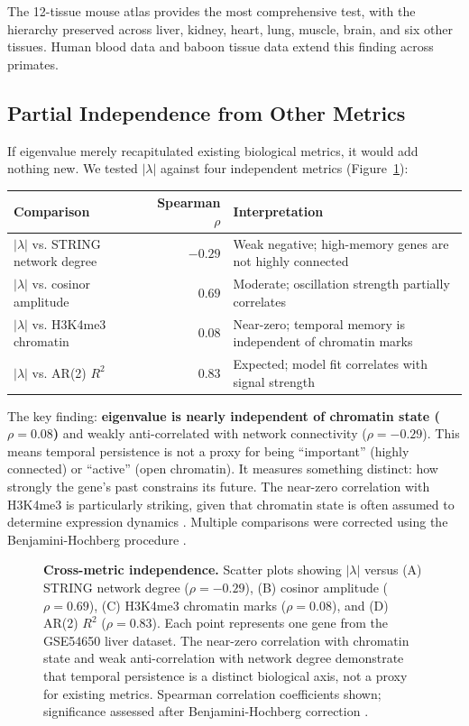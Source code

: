 \documentclass[11pt,letterpaper]{article}
\begin{document}
The 12-tissue mouse atlas \citep{zhang2014circadian} provides the most comprehensive test, with the hierarchy preserved across liver, kidney, heart, lung, muscle, brain, and six other tissues. Human blood data \citep{hughes2010jtk} and baboon tissue data \citep{mure2018diurnal} extend this finding across primates.

\subsection{Partial Independence from Other Metrics}

If eigenvalue merely recapitulated existing biological metrics, it would add nothing new. We tested $|\lambda|$ against four independent metrics (Figure~\ref{fig:independence}):

\begin{center}
\begin{tabular}{lrp{5cm}}
\toprule
\textbf{Comparison} & \textbf{Spearman $\rho$} & \textbf{Interpretation} \\
\midrule
$|\lambda|$ vs. STRING network degree & $-0.29$ & Weak negative; high-memory genes are not highly connected \\
$|\lambda|$ vs. cosinor amplitude & $0.69$ & Moderate; oscillation strength partially correlates \\
$|\lambda|$ vs. H3K4me3 chromatin & $0.08$ & Near-zero; temporal memory is independent of chromatin marks \citep{koike2012transcriptional} \\
$|\lambda|$ vs. AR(2) $R^2$ & $0.83$ & Expected; model fit correlates with signal strength \\
\bottomrule
\end{tabular}
\end{center}

The key finding: \textbf{eigenvalue is nearly independent of chromatin state ($\rho = 0.08$)} and weakly anti-correlated with network connectivity ($\rho = -0.29$). This means temporal persistence is not a proxy for being ``important'' (highly connected) or ``active'' (open chromatin). It measures something distinct: how strongly the gene's past constrains its future. The near-zero correlation with H3K4me3 is particularly striking, given that chromatin state is often assumed to determine expression dynamics \citep{heard2014transgenerational, koike2012transcriptional}. Multiple comparisons were corrected using the Benjamini-Hochberg procedure \citep{benjamini1995controlling}.

\begin{figure}[H]
\caption{\textbf{Cross-metric independence.} Scatter plots showing $|\lambda|$ versus (A) STRING network degree ($\rho = -0.29$), (B) cosinor amplitude ($\rho = 0.69$), (C) H3K4me3 chromatin marks ($\rho = 0.08$), and (D) AR(2) $R^2$ ($\rho = 0.83$). Each point represents one gene from the GSE54650 liver dataset. The near-zero correlation with chromatin state and weak anti-correlation with network degree demonstrate that temporal persistence is a distinct biological axis, not a proxy for existing metrics. Spearman correlation coefficients shown; significance assessed after Benjamini-Hochberg correction \citep{benjamini1995controlling}.}
\label{fig:independence}
\end{figure}
\end{document}
